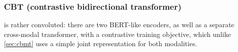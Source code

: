 \subsubsection{CBT (contrastive bidirectional transformer)}
\citet{sun2019learning} is rather convoluted: there are two BERT-like
encoders, as well as a separate cross-modal transformer, with a
contrastive training objective, which unlike \cref{sec:cbmt} uses a
simple joint representation for both modalities.



